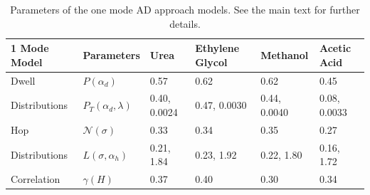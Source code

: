 \documentclass{article}
\begin{document}
  \begin{table}[h]
  \centering
  \begin{tabular}{|M{2cm}|M{1.65cm}|M{1.95cm}|M{1.95cm}|M{1.95cm}|M{1.95cm}|}
   Mode Model  & Parameters                & Urea         & Ethylene Glycol &   Methanol   & Acetic Acid  \\\hline
  Dwell         & $P(\alpha_d)$             & 0.57         & 0.62            & 0.62         & 0.45         \\
  Distributions & $P_T(\alpha_d, \lambda)$  & 0.40, 0.0024 & 0.47, 0.0030    & 0.44, 0.0040 & 0.08, 0.0033 \\\hline
  Hop           & $\mathcal{N}(\sigma)$     & 0.33         & 0.34            & 0.35         & 0.27         \\
  Distributions & $L(\sigma, \alpha_h)$     & 0.21, 1.84   & 0.23, 1.92      & 0.22, 1.80   & 0.16, 1.72   \\\hline
  Correlation   & $\gamma(H)$               & 0.37         & 0.40            & 0.30         & 0.34         \\
  \hline 
  \end{tabular}
  \caption{Parameters of the one mode AD approach models. See the main
  text for further details.}\label{table:sfbm_params}
  \end{table}
  
\end{document}
